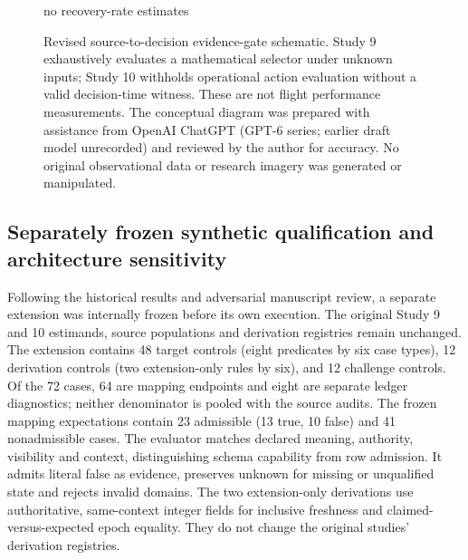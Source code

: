 \documentclass[preprint,12pt]{elsarticle}
\begin{document}
\begin{figure}[H]
\begin{minipage}[t]{0.44\linewidth}
{\begin{minipage}{0.91\linewidth}
no recovery-rate estimates
\end{minipage}}
\end{minipage}
\caption{Revised source-to-decision evidence-gate schematic. Study 9 exhaustively evaluates a mathematical selector under unknown inputs; Study 10 withholds operational action evaluation without a valid decision-time witness. These are not flight performance measurements. The conceptual diagram was prepared with assistance from OpenAI ChatGPT (GPT-6 series; earlier draft model unrecorded) and reviewed by the author for accuracy. No original observational data or research imagery was generated or manipulated.}
\label{fig:phase2gates}
\end{figure}

\subsection{Separately frozen synthetic qualification and architecture sensitivity}
\label{sec:extensionmethods}
Following the historical results and adversarial manuscript review, a separate extension was internally frozen before its own execution. The original Study 9 and 10 estimands, source populations and derivation registries remain unchanged. The extension contains 48 target controls (eight predicates by six case types), 12 derivation controls (two extension-only rules by six), and 12 challenge controls. Of the 72 cases, 64 are mapping endpoints and eight are separate ledger diagnostics; neither denominator is pooled with the source audits. The frozen mapping expectations contain 23 admissible (13 true, 10 false) and 41 nonadmissible cases. The evaluator matches declared meaning, authority, visibility and context, distinguishing schema capability from row admission. It admits literal false as evidence, preserves unknown for missing or unqualified state and rejects invalid domains. The two extension-only derivations use authoritative, same-context integer fields for inclusive freshness and claimed-versus-expected epoch equality. They do not change the original studies' derivation registries.
\end{document}
